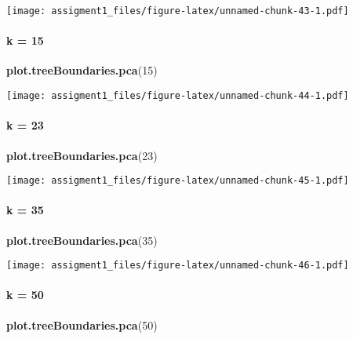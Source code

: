 \documentclass[
]{article}
\newenvironment{Shaded}{\begin{snugshade}}{\end{snugshade}}
\newcommand{\DecValTok}[1]{\textcolor[rgb]{0.00,0.00,0.81}{#1}}
\newcommand{\KeywordTok}[1]{\textcolor[rgb]{0.13,0.29,0.53}{\textbf{#1}}}
\newcommand{\NormalTok}[1]{#1}
\begin{document}
\texttt{[image: assigment1\_files/figure-latex/unnamed-chunk-43-1.pdf]}

\hypertarget{k-15-1}{%
\paragraph{k = 15}\label{k-15-1}}

\begin{Shaded}
\begin{Highlighting}[]
\KeywordTok{plot.treeBoundaries.pca}\NormalTok{(}\DecValTok{15}\NormalTok{)}
\end{Highlighting}
\end{Shaded}

\texttt{[image: assigment1\_files/figure-latex/unnamed-chunk-44-1.pdf]}

\hypertarget{k-23-1}{%
\paragraph{k = 23}\label{k-23-1}}

\begin{Shaded}
\begin{Highlighting}[]
\KeywordTok{plot.treeBoundaries.pca}\NormalTok{(}\DecValTok{23}\NormalTok{)}
\end{Highlighting}
\end{Shaded}

\texttt{[image: assigment1\_files/figure-latex/unnamed-chunk-45-1.pdf]}

\hypertarget{k-35}{%
\paragraph{k = 35}\label{k-35}}

\begin{Shaded}
\begin{Highlighting}[]
\KeywordTok{plot.treeBoundaries.pca}\NormalTok{(}\DecValTok{35}\NormalTok{)}
\end{Highlighting}
\end{Shaded}

\texttt{[image: assigment1\_files/figure-latex/unnamed-chunk-46-1.pdf]}

\hypertarget{k-50-1}{%
\paragraph{k = 50}\label{k-50-1}}

\begin{Shaded}
\begin{Highlighting}[]
\KeywordTok{plot.treeBoundaries.pca}\NormalTok{(}\DecValTok{50}\NormalTok{)}
\end{Highlighting}
\end{Shaded}
\end{document}
